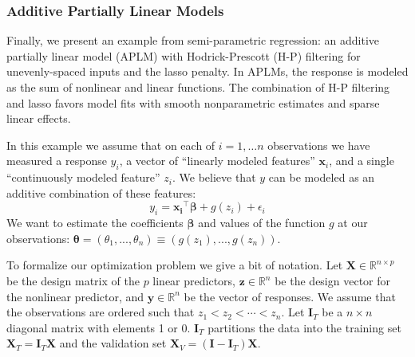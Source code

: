 \documentclass[10pt,letterpaper]{article}
\begin{document}
\subsubsection{Additive Partially Linear Models}\label{sec:aplm}

Finally, we present an example from semi-parametric regression: an additive partially linear model (APLM) with Hodrick-Prescott (H-P) filtering for unevenly-spaced inputs and the lasso penalty. In APLMs, the response is modeled as the sum of nonlinear and linear functions.  The combination of H-P filtering and lasso favors model fits with smooth nonparametric estimates and sparse linear effects.

In this example we assume that on each of $i=1,\ldots n$ observations we have measured a response $y_i$, a vector of ``linearly modeled features'' $\boldsymbol{x}_i$, and a single ``continuously modeled feature'' $z_i$. We believe that $y$ can be modeled as an additive combination of these features:
\begin{equation}
y_i = \boldsymbol{x_i}^\top \boldsymbol{\beta} + g(z_i) + \epsilon_i
\end{equation}
We want to estimate the coefficients $\boldsymbol{\beta}$ and values of the function $g$ at our observations: $\boldsymbol{\theta} = (\theta_1, ..., \theta_n) \equiv (g(z_1), ..., g(z_n))$.

To formalize our optimization problem we give a bit of notation. Let $\boldsymbol{X} \in \mathbb{R}^{n \times p}$ be the design matrix of the $p$ linear predictors, $\boldsymbol{z} \in \mathbb{R}^n$ be the design vector for the nonlinear predictor, and $\boldsymbol{y} \in \mathbb{R}^n$ be the vector of responses. We assume that the observations are ordered such that $z_1 < z_2 < \cdots < z_n$. Let $\boldsymbol{I}_T$ be a $n \times n$ diagonal matrix with elements 1 or 0. $\boldsymbol{I}_T$ partitions the data into the training set $\boldsymbol{X}_T= \boldsymbol{I}_T \boldsymbol{X}$ and the validation set $\boldsymbol{X}_V= (\boldsymbol{I} - \boldsymbol{I}_T) \boldsymbol{X}$.
\end{document}
